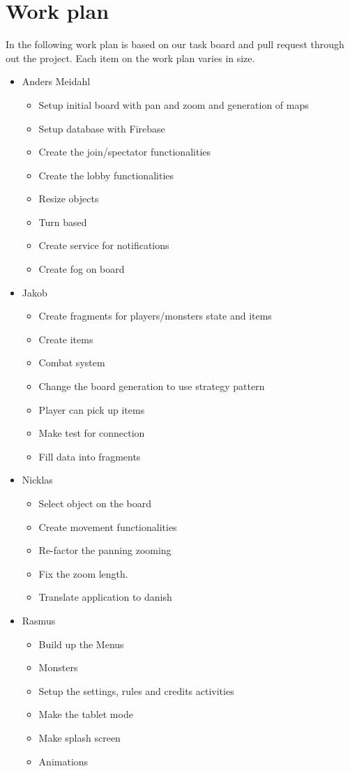 \pagestyle{Uni}

\chapter{Work plan}
In the following work plan is based on our task board and pull request through out the project. Each item on the work plan varies in size.

\begin{itemize}
	\item Anders Meidahl
	\begin{itemize}
		\item Setup initial board with pan and zoom and generation of maps
		\item Setup database with Firebase
		\item Create the join/spectator functionalities
		\item Create the lobby functionalities
		\item Resize objects
		\item Turn based
		\item Create service for notifications
		\item Create fog on board
	\end{itemize}
	
	\item Jakob
	\begin{itemize}
		\item Create fragments for players/monsters state and items
		\item Create items
		\item Combat system
		\item Change the board generation to use strategy pattern
		\item Player can pick up items
		\item Make test for connection
		\item Fill data into fragments
	\end{itemize}
	\item Nicklas
	\begin{itemize}
		\item Select object on the board
		\item Create movement functionalities
		\item Re-factor the panning zooming
		\item Fix the zoom length.
		\item Translate application to danish
	\end{itemize}
	\item Rasmus
	\begin{itemize}
		\item Build up the Menus
		\item Monsters
		\item Setup the settings, rules and credits activities
		\item Make the tablet mode
		\item Make splash screen
		\item Animations
	\end{itemize}
\end{itemize}